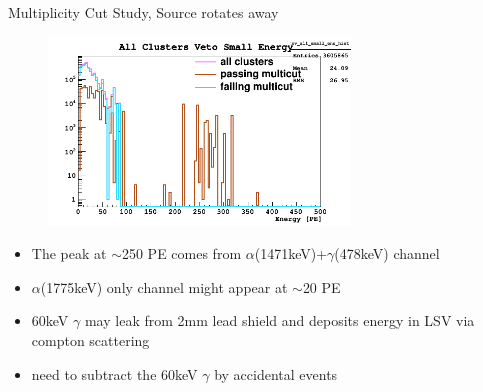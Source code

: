 \documentclass[9pt]{beamer}
\begin{document}
\begin{frame}{Multiplicity Cut Study, Source rotates away}
\begin{figure}
\includegraphics[height= 5cm, width=.8\textwidth]{multicut_away_Feb7PM.png}
\end{figure}
\begin{itemize}
[bullet]
\item The peak at $\sim$250 PE comes from $\alpha$(1471keV)+$\gamma$(478keV) channel
\item $\alpha$(1775keV) only channel might appear at $\sim$20 PE 
\item 60keV $\gamma$ may leak from 2mm lead shield and deposits energy in LSV via compton scattering
\item need to subtract the 60keV $\gamma$ by accidental events 
\end{itemize}
\end{frame}
\end{document}
